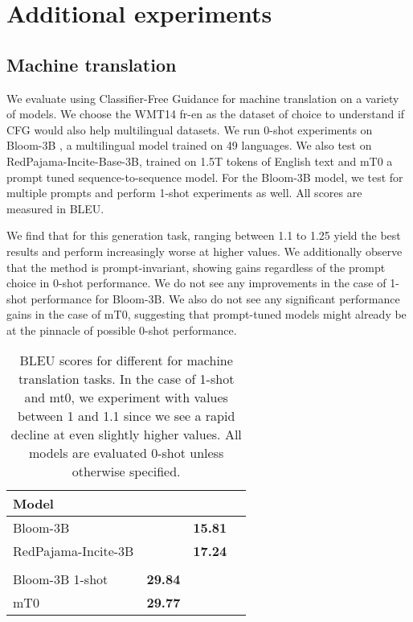 \documentclass{article}
\begin{document}
\FloatBarrier


\section{Additional experiments}

\subsection{Machine translation}
\label{app:machine-translation}

We evaluate using Classifier-Free Guidance for machine translation on a variety of models. We choose the WMT14 fr-en \cite{bojar-EtAl:2014:W14-33_wmt14_fr_en} as the dataset of choice to understand if CFG would also help multilingual datasets. We run 0-shot experiments on Bloom-3B \cite{Scao2022BLOOMA1}, a multilingual model trained on 49 languages. We also test on RedPajama-Incite-Base-3B, trained on 1.5T tokens of English text and mT0 \cite{Muennighoff2022CrosslingualGT_mt0} a prompt tuned sequence-to-sequence model. For the Bloom-3B model, we test for multiple prompts and perform 1-shot experiments as well.  All scores are measured in BLEU.

We find that for this generation task,  ranging between 1.1 to 1.25 yield the best results and perform increasingly worse at higher values. We additionally observe that the method is prompt-invariant, showing gains regardless of the prompt choice in 0-shot performance. We do not see any improvements in the case of 1-shot performance for Bloom-3B. We also do not see any significant performance gains in the case of mT0, suggesting that prompt-tuned models might already be at the pinnacle of possible 0-shot performance.

\begin{table}[t]
    \centering
    \begin{tabular}{lccr} \toprule     Model    &  &  &  \\
         \midrule
        Bloom-3B  &  & \textbf{15.81} &  \\
        RedPajama-Incite-3B &  & \textbf{17.24} &  \\
        \midrule
                         &  &  &  \\
        \midrule
        Bloom-3B 1-shot & \textbf{29.84} &  &  \\
        mT0  & \textbf{29.77} & \textbf{} &  \\
        
        \bottomrule
    \end{tabular}
    \caption{BLEU scores for different  for machine translation tasks. In the case of 1-shot and mt0, we experiment with  values between 1 and 1.1 since we see a rapid decline at even slightly higher values. All models are evaluated 0-shot unless otherwise specified.}
    \label{tab:mt-gen}
\end{table}
\end{document}
